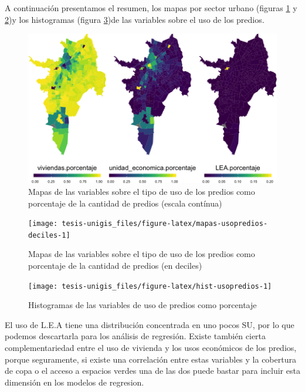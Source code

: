 \documentclass[12pt,]{book}
\begin{document}
A continuación presentamos el resumen, los mapas por sector urbano
(figuras \ref{fig:mapas-usopredios-cont} y
\ref{fig:mapas-usopredios-deciles})y los histogramas (figura
\ref{fig:hist-usopredios})de las variables sobre el uso de los predios.

\begin{figure}
\includegraphics[width=1\linewidth]{tesis-unigis_files/figure-latex/mapas-usopredios-cont-1} \caption{Mapas de las variables sobre el tipo de uso de los predios como porcentaje de la cantidad de predios (escala contínua)}\label{fig:mapas-usopredios-cont}
\end{figure}

\begin{figure}
\texttt{[image: tesis-unigis\_files/figure-latex/mapas-usopredios-deciles-1]} \caption{Mapas de las variables sobre el tipo de uso de los predios como porcentaje de la cantidad de predios (en deciles)}\label{fig:mapas-usopredios-deciles}
\end{figure}

\begin{figure}
\texttt{[image: tesis-unigis\_files/figure-latex/hist-usopredios-1]} \caption{Histogramas de las variables de uso de predios como porcentaje}\label{fig:hist-usopredios}
\end{figure}

El uso de L.E.A tiene una distribución concentrada en uno pocos SU, por
lo que podemos descartarla para los análisis de regresión. Existe
también cierta complementariedad entre el uso de vivienda y los usos
económicos de los predios, porque seguramente, si existe una correlación
entre estas variables y la cobertura de copa o el acceso a espacios
verdes una de las dos puede bastar para incluir esta dimensión en los
modelos de regresion.
\end{document}
